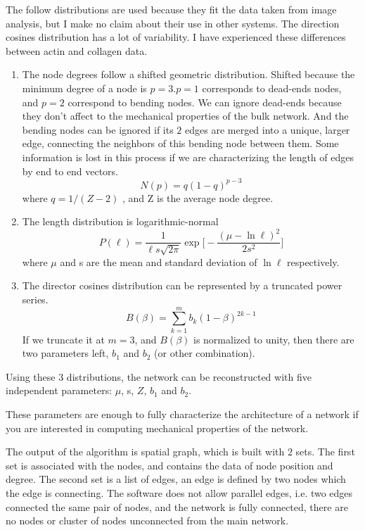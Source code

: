 The follow distributions are used because they fit the data taken from image
analysis, but I make no claim about their use in other systems. The
direction cosines distribution has a lot of variability. I have experienced
these differences between actin and collagen data.
\begin{enumerate}
\item The node degrees follow a shifted geometric distribution. Shifted because
the minimum degree of a node is $p=3$.$p=1$ corresponds to dead-ends nodes, and
$p=2$ correspond to bending nodes. We can ignore dead-ends because they don't
affect to the mechanical properties of the bulk network. And the bending nodes
can be ignored if its $2$ edges are merged into a unique, larger edge,
connecting the neighbors of this bending node between them. Some information is lost in this
process if we are characterizing the length of edges by end to end
vectors.
\begin{equation} \label{degree-dist}
N(p)=q(1-q)^{p-3} 
\end{equation}
where $q=1/(Z-2)$ , and Z is the average node degree.
\item The length distribution is logarithmic-normal  
\begin{equation} \label{length-dist}
P(\ell)=\frac{1}{\ell
s\sqrt{2\pi}}\exp{\bigg[-\frac{(\mu-\ln{\ell})^2}{2s^2}\bigg]}
\end{equation}
where $\mu$ and s are the mean and standard deviation of $\ln{\ell}$
respectively.
\item The director cosines distribution can be represented by a truncated power
series.
\begin{equation} \label{cosines-dist}
B(\beta)=\sum_{k=1}^{m} b_k(1-\beta)^{2k-1}
\end{equation}
If we truncate it at $m=3$, and $B(\beta)$ is normalized to unity, then there
are two parameters left, $b_1$ and $b_2$ (or other combination).
\end{enumerate}

Using these $3$ distributions, the network can be reconstructed with five
independent parameters: $\mu$, s, $Z$, $b_1$ and $b_2$.

These parameters are enough to fully characterize the architecture of a
network if you are interested in computing
mechanical properties of the network.

The output of the algorithm is spatial \gls{graph}, which is built with $2$
sets. The first set is associated with the nodes, and contains the data of node
position and degree. The second set is a list of edges, an edge is defined
by two nodes which the edge is connecting. The software does not allow parallel
edges, i.e. two edges connected the same pair of nodes, and the network is fully
connected, there are no nodes or cluster of nodes unconnected from the main
network.
 
 
